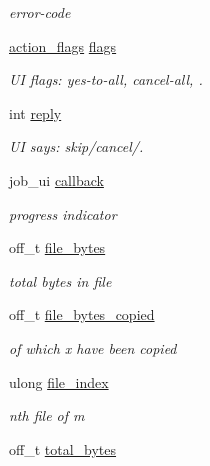 \begin{CompactItemize}
\begin{CompactList}\small\item\em error-code \item\end{CompactList}\item 
\hyperlink{action_8h_a42}{action\_\-flags} \hyperlink{struct__noir__job_o5}{flags}
\begin{CompactList}\small\item\em UI flags: yes-to-all, cancel-all, . \item\end{CompactList}\item 
int \hyperlink{struct__noir__job_o6}{reply}
\begin{CompactList}\small\item\em UI says: skip/cancel/. \item\end{CompactList}\item 
\hypertarget{struct__noir__job_o7}{
job\_\-ui \hyperlink{struct__noir__job_o7}{callback}}
\label{struct__noir__job_o7}

\begin{CompactList}\small\item\em progress indicator \item\end{CompactList}\item 
\hypertarget{struct__noir__job_o8}{
off\_\-t \hyperlink{struct__noir__job_o8}{file\_\-bytes}}
\label{struct__noir__job_o8}

\begin{CompactList}\small\item\em total bytes in file \item\end{CompactList}\item 
\hypertarget{struct__noir__job_o9}{
off\_\-t \hyperlink{struct__noir__job_o9}{file\_\-bytes\_\-copied}}
\label{struct__noir__job_o9}

\begin{CompactList}\small\item\em of which x have been copied \item\end{CompactList}\item 
\hypertarget{struct__noir__job_o10}{
ulong \hyperlink{struct__noir__job_o10}{file\_\-index}}
\label{struct__noir__job_o10}

\begin{CompactList}\small\item\em nth file of m \item\end{CompactList}\item 
\hypertarget{struct__noir__job_o11}{
off\_\-t \hyperlink{struct__noir__job_o11}{total\_\-bytes}}
\label{struct__noir__job_o11}


\end{CompactItemize}
